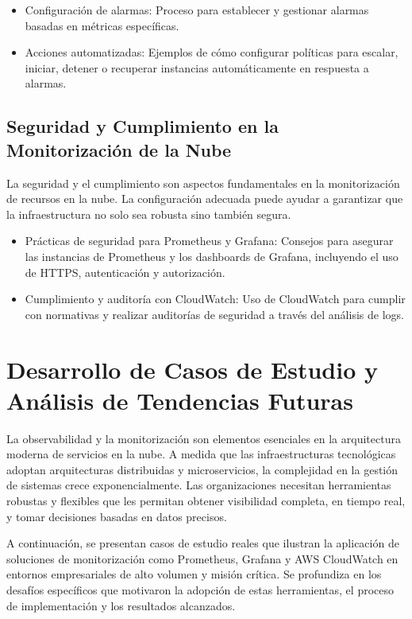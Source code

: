 {            \begin{itemize}
                \item Configuración de alarmas: Proceso para establecer y gestionar alarmas basadas en métricas específicas.
                \item Acciones automatizadas: Ejemplos de cómo configurar políticas para escalar, iniciar, detener o recuperar instancias automáticamente en respuesta a alarmas.
            \end{itemize}
            
        \subsection{Seguridad y Cumplimiento en la Monitorización de la Nube}
            La seguridad y el cumplimiento son aspectos fundamentales en la monitorización de recursos en la nube. La configuración adecuada puede ayudar a garantizar que la infraestructura no solo sea robusta sino también segura.
            
            \begin{itemize}
                \item Prácticas de seguridad para Prometheus y Grafana: Consejos para asegurar las instancias de Prometheus y los dashboards de Grafana, incluyendo el uso de HTTPS, autenticación y autorización.
                \item Cumplimiento y auditoría con CloudWatch: Uso de CloudWatch para cumplir con normativas y realizar auditorías de seguridad a través del análisis de logs.
            \end{itemize}
            
    \section{Desarrollo de Casos de Estudio y Análisis de Tendencias Futuras}
        La observabilidad y la monitorización son elementos esenciales en la arquitectura moderna de servicios en la nube. A medida que las infraestructuras tecnológicas adoptan arquitecturas distribuidas y microservicios, la complejidad en la gestión de sistemas crece exponencialmente. Las organizaciones necesitan herramientas robustas y flexibles que les permitan obtener visibilidad completa, en tiempo real, y tomar decisiones basadas en datos precisos. 
        
        A continuación, se presentan casos de estudio reales que ilustran la aplicación de soluciones de monitorización como Prometheus, Grafana y AWS CloudWatch en entornos empresariales de alto volumen y misión crítica. Se profundiza en los desafíos específicos que motivaron la adopción de estas herramientas, el proceso de implementación y los resultados alcanzados.
        
}
